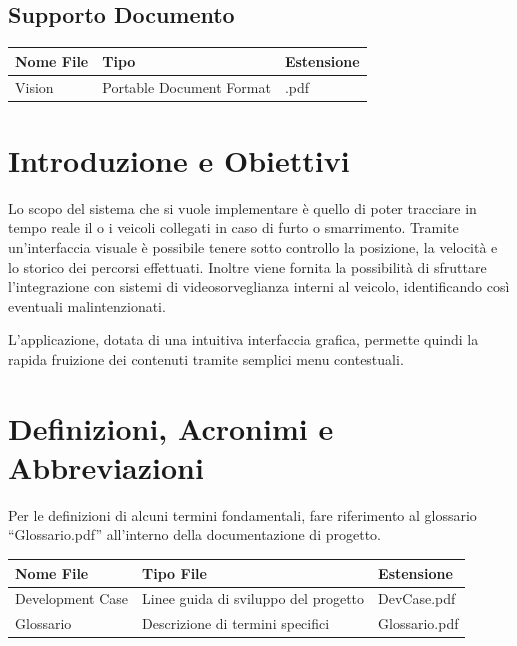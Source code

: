 \documentclass[a4paper,12pt]{article}
\begin{document}
\subsection{Supporto Documento}
\begin{table}[ht]
\begin{center}
\begin{tabular}{p{6cm} p{5cm} p{2cm}}
\rowcolor{Ash}
\hline
Nome File & Tipo & Estensione \\ \hline
Vision & Portable Document Format & .pdf \\ \hline
\end{tabular}
\end{center}
\end{table}

\clearpage

\pagebreak


\section{Introduzione e Obiettivi}

Lo scopo del sistema che si vuole implementare è quello di poter tracciare in tempo reale il o i veicoli collegati in caso di furto o smarrimento. Tramite un'interfaccia visuale è possibile tenere sotto controllo la posizione, la velocità e lo storico dei percorsi effettuati. Inoltre viene fornita la possibilità di sfruttare l'integrazione con sistemi di videosorveglianza interni al veicolo, identificando così eventuali malintenzionati. 

L'applicazione, dotata di una intuitiva interfaccia grafica, permette quindi la rapida fruizione dei contenuti tramite semplici menu contestuali.



\section{Definizioni, Acronimi e Abbreviazioni}

Per le definizioni di alcuni termini fondamentali, fare riferimento al glossario ``Glossario.pdf'' all'interno della documentazione di progetto.

\begin{table}[h]
\begin{center}
\begin{tabular}{ l  l  l } 
\rowcolor{Ash}	
\hline	
Nome File & Tipo File & Estensione  \\ \hline
Development Case & Linee guida di sviluppo del progetto & DevCase.pdf  \\ 
Glossario & Descrizione di termini specifici & Glossario.pdf  \\ \hline
\end{tabular}
\end{center}
\end{table}
\end{document}
